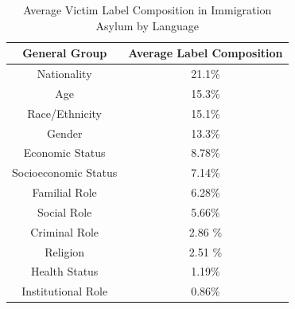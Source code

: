 \documentclass[sigconf]{acmart}
\begin{document}
\begin{table}[h]
    \centering
    \caption{Average Victim Label Composition in Immigration Asylum by Language}
    \label{tab:imm_asylum_avg_lang_victim}
    \begin{tabular}{c|c}
        \toprule
        \textbf{General Group} & \textbf{Average Label Composition} \\
        \midrule
        Nationality & 21.1\% \\
        Age & 15.3\% \\
        Race/Ethnicity & 15.1\% \\
        Gender & 13.3\% \\
        Economic Status & 8.78\% \\
        Socioeconomic Status & 7.14\% \\
        Familial Role & 6.28\% \\
        Social Role & 5.66\% \\
        Criminal Role & 2.86 \% \\
        Religion & 2.51 \% \\
        Health Status & 1.19\% \\
        Institutional Role & 0.86\% \\
        \bottomrule
    \end{tabular}
\end{table}
\end{document}
